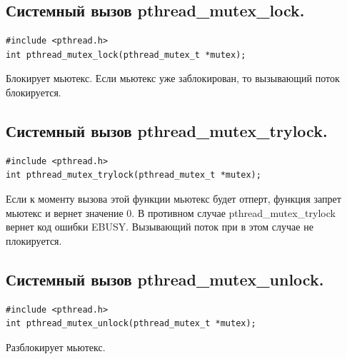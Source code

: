 \documentclass[a4paper]{article}
\begin{document}
\subsection{\Large Системный вызов pthread\_mutex\_lock.}
\begin{verbatim}
#include <pthread.h>
int pthread_mutex_lock(pthread_mutex_t *mutex);
\end{verbatim}
Блокирует мьютекс. Если мьютекс уже заблокирован, то вызывающий поток блокируется.

\subsection{\Large Системный вызов pthread\_mutex\_trylock.}
\begin{verbatim}
#include <pthread.h>
int pthread_mutex_trylock(pthread_mutex_t *mutex);
\end{verbatim}
Если к моменту вызова этой функции мьютекс будет отперт, функция запрет мьютекс и вернет значение 0. В противном случае pthread\_mutex\_trylock вернет код ошибки EBUSY. Вызывающий поток при в этом случае не плокируется.

\subsection{\Large Системный вызов pthread\_mutex\_unlock.}
\begin{verbatim}
#include <pthread.h>
int pthread_mutex_unlock(pthread_mutex_t *mutex);
\end{verbatim}
Разблокирует мьютекс.

\newpage
\end{document}
